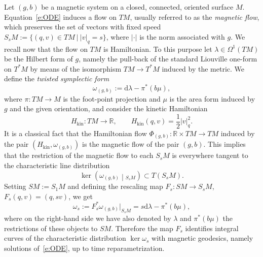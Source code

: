 \documentclass[10pt]{amsart}
\theoremstyle{definition}
\newcommand{\R}{\mathbb{R}}
\newcommand{\diff}{\mathrm{d}}
\newcommand{\kin}{{\mathrm{kin}}}
\begin{document}
Let $(g,b)$ be a magnetic system on a closed, connected, oriented surface $M$. Equation~\eqref{e:ODE} induces a flow on $TM$, usually referred to as the \emph{magnetic flow}, which preserves the set of vectors with fixed speed $S_s M := \{(q,v)\in TM\ |\ |v|_q=s\}$, where $|\cdot|$ is the norm associated with $g$. We recall now that the flow on $TM$ is Hamiltonian. To this purpose let $\lambda\in \Omega^1(TM)$ be the Hilbert form of $g$, namely the pull-back of the standard Liouville one-form on $T^*M$ by means of the isomorphism $TM\to T^*M$ induced by the metric. We define the \emph{twisted symplectic form}
\[
\omega_{(g,b)} := \diff \lambda - \pi^*(b\mu),
\]
where $\pi:TM\to M$ is the foot-point projection and $\mu$ is the area form induced by $g$ and the given orientation, and consider the kinetic Hamiltonian
\[
H_\kin :TM \to \R,\qquad H_{\kin}(q,v) = \frac{1}{2}|v|^2_q.
\]
It is a classical fact that the Hamiltonian flow $\Phi_{(g,b)}:\R\times TM\to TM$ induced by the pair $(H_\kin,\omega_{(g,b)})$ is the magnetic flow of the pair $(g,b)$. This implies that the restriction of the magnetic flow to each $S_s M$ is everywhere tangent to the characteristic line distribution
\[
\ker \left(\omega_{(g,b)}\middle|_{S_s M}\right)\subset T \left(S_s M\right).
\]
Setting $SM:=S_1M$ and defining the rescaling map $F_s:SM\to S_sM$, $F_s(q,v)=(q,sv)$, we get
\[
\omega_s:=F_s^*\omega_{(g,b)}\big|_{S_sM}=s\diff\lambda-\pi^*(b\mu),
\]
where on the right-hand side we have also denoted by $\lambda$ and $\pi^*(b\mu)$ the restrictions of these objects to $SM$. Therefore the map $F_s$ identifies integral curves of the characteristic distribution $\ker\omega_s$ with magnetic geodesics, namely solutions of~\eqref{e:ODE}, up to time reparametrization.
\end{document}
